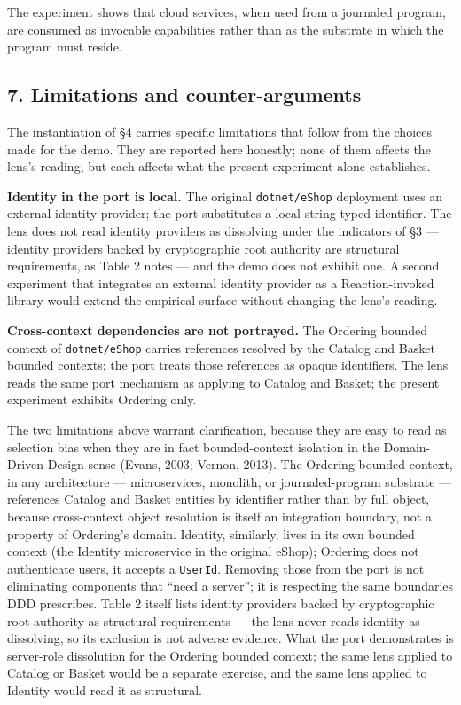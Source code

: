 \documentclass[
]{article}
\newcounter{none} %
\begin{document}
The experiment shows that cloud services, when used from a journaled
program, are consumed as invocable capabilities rather than as the
substrate in which the program must reside.

\subsection{7. Limitations and
counter-arguments}\label{limitations-and-counter-arguments}

The instantiation of §4 carries specific limitations that follow from
the choices made for the demo. They are reported here honestly; none of
them affects the lens's reading, but each affects what the present
experiment alone establishes.

\textbf{Identity in the port is local.} The original
\texttt{dotnet/eShop} deployment uses an external identity provider; the
port substitutes a local string-typed identifier. The lens does not read
identity providers as dissolving under the indicators of §3 --- identity
providers backed by cryptographic root authority are structural
requirements, as Table 2 notes --- and the demo does not exhibit one. A
second experiment that integrates an external identity provider as a
Reaction-invoked library would extend the empirical surface without
changing the lens's reading.

\textbf{Cross-context dependencies are not portrayed.} The Ordering
bounded context of \texttt{dotnet/eShop} carries references resolved by
the Catalog and Basket bounded contexts; the port treats those
references as opaque identifiers. The lens reads the same port mechanism
as applying to Catalog and Basket; the present experiment exhibits
Ordering only.

The two limitations above warrant clarification, because they are easy
to read as selection bias when they are in fact bounded-context
isolation in the Domain-Driven Design sense (Evans, 2003; Vernon, 2013).
The Ordering bounded context, in any architecture --- microservices,
monolith, or journaled-program substrate --- references Catalog and
Basket entities by identifier rather than by full object, because
cross-context object resolution is itself an integration boundary, not a
property of Ordering's domain. Identity, similarly, lives in its own
bounded context (the Identity microservice in the original eShop);
Ordering does not authenticate users, it accepts a \texttt{UserId}.
Removing those from the port is not eliminating components that ``need a
server''; it is respecting the same boundaries DDD prescribes. Table 2
itself lists identity providers backed by cryptographic root authority
as structural requirements --- the lens never reads identity as
dissolving, so its exclusion is not adverse evidence. What the port
demonstrates is server-role dissolution for the Ordering bounded
context; the same lens applied to Catalog or Basket would be a separate
exercise, and the same lens applied to Identity would read it as
structural.
\end{document}
